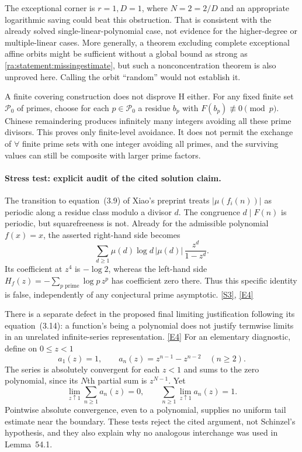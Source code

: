 \documentclass[11pt]{article}
\newcommand{\sref}[2]{\hyperlink{source:#1:#2}{[S#2]}}
\newcommand{\eref}[2]{\hyperlink{extra:#1:#2}{[E#2]}}
\begin{document}
The exceptional corner is $r=1,D=1$, where $N=2=2/D$ and an appropriate
logarithmic saving could beat this obstruction. That is consistent with
the already solved single-linear-polynomial case, not evidence for the
higher-degree or multiple-linear cases. More generally, a theorem
excluding complete exceptional affine orbits might be sufficient without
a global bound as strong as \eqref{ra:statement:missingestimate}, but such a
nonconcentration theorem is also unproved here. Calling the orbit
``random'' would not establish it.

A finite covering construction does not disprove H either. For any fixed
finite set $\mathcal P_0$ of primes, choose for each $p\in\mathcal P_0$
a residue $b_p$ with $F(b_p)\not\equiv0\pmod p$. Chinese remaindering
produces infinitely many integers avoiding all these prime divisors.
This proves only finite-level avoidance. It does not permit the exchange
of $\forall$ finite prime sets with one integer avoiding all primes, and
the surviving values can still be composite with larger prime factors.

\paragraph{Stress test: explicit audit of the cited solution claim.}
The transition to equation~(3.9) of Xiao's preprint treats
$|\mu(f_i(n))|$ as periodic along a residue class modulo a divisor $d$.
The congruence $d\mid F(n)$ is periodic, but squarefreeness is not.
Already for the admissible polynomial $f(x)=x$, the asserted right-hand
side becomes
\[
 \sum_{d\ge1}\mu(d)\log d\,|\mu(d)|\,
       \frac{z^d}{1-z^d}.
\]
Its coefficient at $z^4$ is $-\log2$, whereas the left-hand side
$H_f(z)=-\sum_{p\text{ prime}}\log p\,z^p$ has coefficient zero there.
Thus this specific identity is false, independently of any conjectural
prime asymptotic. \sref{statement}{3}, \eref{statement}{4}

There is a separate defect in the proposed final limiting justification
following its equation~(3.14): a function's being a polynomial does not
justify termwise limits in an unrelated infinite-series representation.
\eref{statement}{4}
For an elementary diagnostic, define on $0\le z<1$
\[
 a_1(z)=1,\qquad a_n(z)=z^{n-1}-z^{n-2}\quad(n\ge2).
\]
The series is absolutely convergent for each $z<1$ and sums to the zero
polynomial, since its $N$th partial sum is $z^{N-1}$. Yet
\[
 \lim_{z\uparrow1}\sum_{n\ge1}a_n(z)=0,
 \qquad
 \sum_{n\ge1}\lim_{z\uparrow1}a_n(z)=1.
\]
Pointwise absolute convergence, even to a polynomial, supplies no
uniform tail estimate near the boundary. These tests reject the cited
argument, not Schinzel's hypothesis, and they also explain why no
analogous interchange was used in Lemma~54.1.
\end{document}
